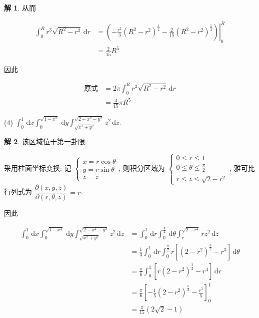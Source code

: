 \documentclass[a4paper,12pt]{article}
\theoremstyle{definition}
\newtheorem*{sol}{解}
\begin{document}
\begin{sol}
    从而

    \begin{align*}
        \int_0^R r^3\sqrt{R^2-r^2}\,\mathrm{d}r
         & =\left.\left(-\frac{r^2}{3}(R^2-r^2)^{\frac{3}{2}}-\frac{2}{15}(R^2-r^2)^{\frac{5}{2}}\right)\right|_0^R \\
         & =\frac{2}{15}R^5
    \end{align*}

    因此

    \begin{align*}
        \text{原式}
         & =2\pi\int_0^R r^3\sqrt{R^2-r^2}\,\mathrm{d}r \\
         & =\frac{4}{15}\pi R^5
    \end{align*}
\end{sol}
(4) $\displaystyle\int_{0}^{1}\,\mathrm{d}x \int_{0}^{\sqrt{1-x^2}}\,\mathrm{d}y \int_{\sqrt{x^2+y^2}}^{\sqrt{2-x^2-y^2}} z^2 \, \mathrm{d}z$.
\begin{sol}
    该区域位于第一卦限.

    采用柱面坐标变换: 记 $\begin{cases}
            x=r\cos\theta \\
            y=r\sin\theta \\
            z=z
        \end{cases}$, 则积分区域为 $\begin{cases}
            0\leq r\leq 1                 \\
            0\leq\theta\leq \frac{\pi}{2} \\
            r\leq z\leq \sqrt{2-r^2}
        \end{cases}$, 雅可比行列式为 $\dfrac{\partial(x,y,z)}{\partial(r,\theta,z)}=r$.

    因此

    \begin{align*}
        \int_{0}^{1}\,\mathrm{d}x \int_{0}^{\sqrt{1-x^2}}\,\mathrm{d}y \int_{\sqrt{x^2+y^2}}^{\sqrt{2-x^2-y^2}} z^2 \, \mathrm{d}z
         & =\int_0^1\,\mathrm{d}r\int_0^{\frac{\pi}{2}}\,\mathrm{d}\theta\int_r^{\sqrt{2-r^2}}rz^2\,\mathrm{d}z             \\
         & =\frac{1}{3}\int_0^1\,\mathrm{d}r\int_0^{\frac{\pi}{2}}r\left[(2-r^2)^{\frac{3}{2}}-r^3\right]\,\mathrm{d}\theta \\
         & =\frac{\pi}{6}\int_0^1\left[r(2-r^2)^{\frac{3}{2}}-r^4\right]\,\mathrm{d}r                                       \\
         & =\frac{\pi}{6}\left[-\frac{1}{5}(2-r^2)^{\frac{5}{2}}-\frac{r^5}{5}\right]_0^1                                   \\
         & =\frac{\pi}{15}(2\sqrt{2}-1)
    \end{align*}
\end{sol}
\end{document}
